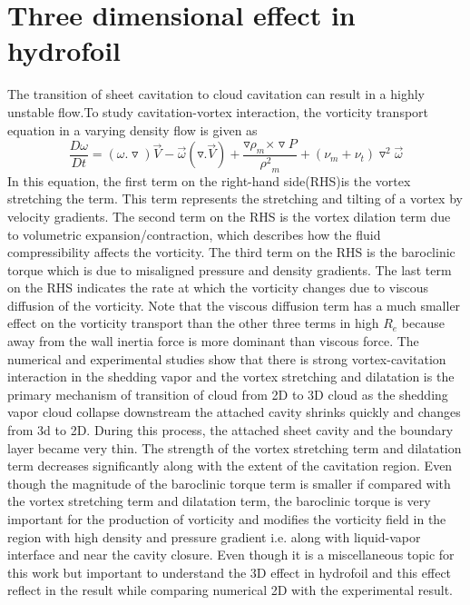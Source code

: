 \section{Three dimensional effect in hydrofoil}
The transition of sheet cavitation to cloud cavitation can result in a highly unstable flow.To study cavitation-vortex interaction\cite{JI2015}, the vorticity transport equation in a varying  density 
flow is given as 
\begin{equation}
\frac{D\omega}{Dt}=({\omega.\triangledown})\vec{V} -\vec{\omega}(\triangledown.\vec{V}) + \frac{{\triangledown{\rho}_m} {\times\triangledown P}}{{{\rho}^2}_m} +({\nu}_m +{\nu}_t){{\triangledown}^2}\vec{\omega}
\end{equation}
In this equation, the first term on the right-hand side(RHS)is the vortex stretching the term. This term represents the stretching and tilting of a vortex by velocity gradients. The second term on the RHS
is the vortex dilation term due to volumetric expansion/contraction, which describes how the fluid compressibility affects the vorticity. The third term on the RHS is the baroclinic torque which is due to 
misaligned pressure and density gradients. The last term on the RHS indicates the rate at which the vorticity changes due to viscous diffusion of the vorticity. Note that the viscous diffusion term has a much smaller
effect on the vorticity transport than the other three terms in high $R_e$ because away from the wall inertia force is more dominant than viscous force. The numerical and experimental studies show
that there is strong vortex-cavitation interaction in the shedding vapor and the vortex stretching and dilatation is the primary mechanism of transition of cloud from 2D to 3D cloud as the shedding 
vapor cloud collapse downstream the attached cavity shrinks quickly and changes from 3d to 2D. During this process, the attached sheet cavity and the boundary layer became very thin. The strength of the vortex 
stretching term and dilatation term decreases significantly along with the extent of the cavitation region. Even though the magnitude of the baroclinic torque term is smaller if compared with the vortex stretching 
term and dilatation term, the baroclinic torque is very important for the production of vorticity and modifies the vorticity field in the region with high density and pressure gradient i.e. along with liquid-vapor 
interface and near the cavity closure. Even though it is a miscellaneous topic for this work but important to understand the 3D effect in hydrofoil and this effect reflect in the result while comparing numerical
2D with the experimental result.

